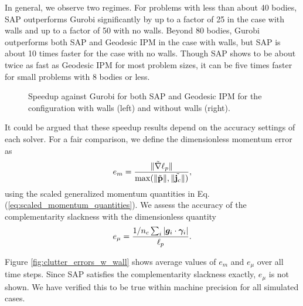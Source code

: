 In general, we observe two regimes. For problems with less than about 40 bodies,
SAP outperforms Gurobi significantly by up to a factor of 25 in the case with
walls and up to a factor of 50 with no walls. Beyond 80 bodies, Gurobi
outperforms both SAP and Geodesic IPM in the case with walls, but SAP is about
10 times faster for the case with no walls. Though SAP shows to be about twice
as fast as Geodesic IPM for most problem sizes, it can be five times faster for
small problems with 8 bodies or less.
\begin{figure}[!h]
	\centering
	\caption{\label{fig:clutter_speedup} 
	Speedup against Gurobi for both SAP and Geodesic IPM for the configuration with walls (left) and without walls (right).}
\end{figure}

It could be argued that these speedup results depend on the accuracy settings of
each solver. For a fair comparison, we define the dimensionless momentum error
as
\begin{equation}
	e_m = \frac{\Vert\tilde{\nabla}\ell_p\Vert}{\max(\Vert\tilde{{\mathbf{p}}}\Vert,\Vert\tilde{{\mathbf{j}}_c}\Vert)},\nonumber
\end{equation}
using the scaled generalized momentum quantities in Eq.
(\ref{eq:scaled_momentum_quantities}). We assess the accuracy of the
complementarity slackness with the dimensionless quantity
\begin{eqnarray*}
	e_\mu = \frac{1/n_c\sum_i|\bm{g}_i\cdot{\bm\gamma}_i|}{\ell_p}.
\end{eqnarray*}

Figure \ref{fig:clutter_errors_w_wall} shows average values of $e_m$ and $e_\mu$
over all time steps. Since SAP satisfies the complementarity slackness exactly,
$e_\mu$ is not shown. We have verified this to be true within machine precision
for all simulated cases.

